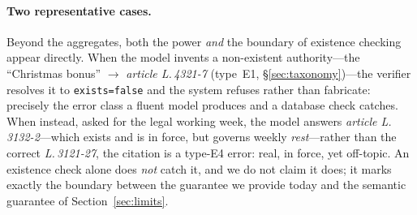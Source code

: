\paragraph{Two representative cases.}
Beyond the aggregates, both the power \emph{and} the boundary of existence
checking appear directly. When the model invents a non-existent
authority---the ``Christmas bonus'' $\to$ \emph{article L.\,4321-7} (type~E1,
\S\ref{sec:taxonomy})---the verifier resolves it to \texttt{exists=false} and
the system refuses rather than fabricate: precisely the error class a fluent
model produces and a database check catches. When instead, asked for the legal
working week, the model answers \emph{article L.\,3132-2}---which exists and is
in force, but governs weekly \emph{rest}---rather than the correct
\emph{L.\,3121-27}, the citation is a type-E4 error: real, in force, yet
off-topic. An existence check alone does \emph{not} catch it, and we do not
claim it does; it marks exactly the boundary between the guarantee we provide
today and the semantic guarantee of Section~\ref{sec:limits}.
